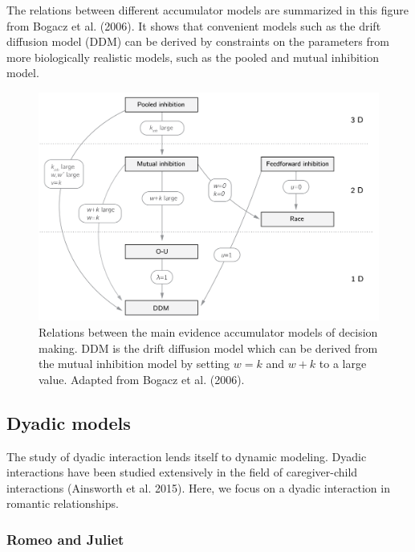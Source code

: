 \documentclass[
  a4paper,
  DIV=11,
  numbers=noendperiod]{scrreprt}
\begin{document}
The relations between different accumulator models are summarized in
this figure from Bogacz et al. (2006). It shows that convenient models
such as the drift diffusion model (DDM) can be derived by constraints on
the parameters from more biologically realistic models, such as the
pooled and mutual inhibition model.

\begin{figure}

{\centering \includegraphics{media/ch4n/ch4n-8__figure57.png}

}

\caption{\label{fig-ch4n-img8-old-56}Relations between the main evidence
accumulator models of decision making. DDM is the drift diffusion model
which can be derived from the mutual inhibition model by setting
\(w = k\) and \(w + k\) to a large value. Adapted from Bogacz et al.
(2006).}

\end{figure}

\hypertarget{sec-Dyadic-models}{%
\subsection{Dyadic models}\label{sec-Dyadic-models}}

The study of dyadic interaction lends itself to dynamic modeling. Dyadic
interactions have been studied extensively in the field of
caregiver-child interactions (Ainsworth et al. 2015). Here, we focus on
a dyadic interaction in romantic relationships.

\hypertarget{sec-Romeo-and-Juliet}{%
\subsubsection{Romeo and Juliet}\label{sec-Romeo-and-Juliet}}
\end{document}
